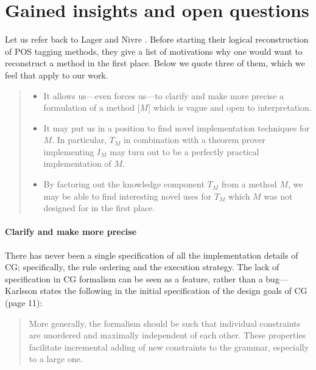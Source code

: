 \section{Gained insights and open questions}

Let us refer back to Lager and Nivre \cite{lager_nivre01}. 
Before starting their logical reconstruction of POS tagging methods, 
they give a list of motivations why one would want to reconstruct a method in the first place.
Below we quote three of them, which we feel that apply to our work.

\begin{quote}
\begin{itemize}
\item It allows us---even forces us---to clarify and make more precise a formulation of a method [$M$] which is vague and open to interpretation.
\item It may put us in a position to find novel implementation techniques for $M$. 
In particular, $T_M$ in combination with a theorem prover implementing $I_M$ may turn out to be a perfectly practical implementation of $M$.
\item By factoring out the knowledge component $T_M$ from a method $M$, 
we may be able to find interesting novel uses for $T_M$ which $M$ was not designed for in the first place.
\end{itemize}
\end{quote}


\paragraph{Clarify and make more precise} %

There has never been a single specification of all the implementation details of CG; specifically, the rule ordering and the execution strategy.
The lack of specification in CG formalism can be seen as a feature, rather than a bug---Karlsson states the following in the initial specification of the design goals of CG \cite{karlsson1995constraint} (page 11):

\begin{quote}
More generally, the formalism should be such that individual constraints are unordered and maximally independent of each other. These properties facilitate incremental adding of new constraints to the grammar, especially to a large one.
\end{quote}

